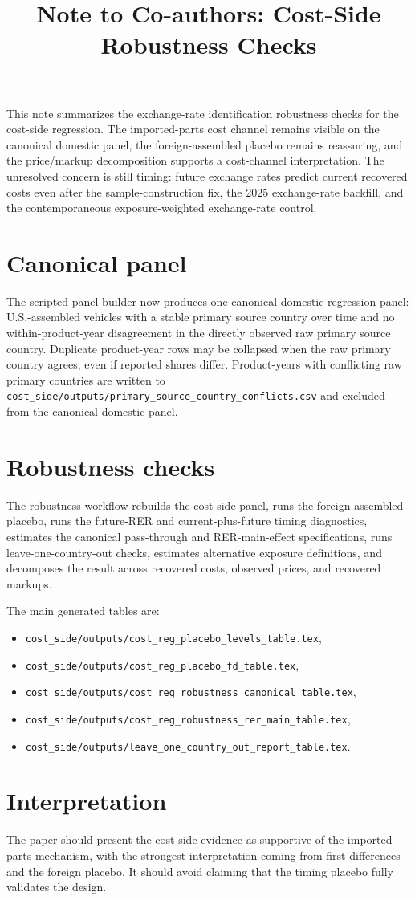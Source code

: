 \documentclass[11pt]{article}
\title{Note to Co-authors: Cost-Side Robustness Checks}
\date{}
\begin{document}
\maketitle

This note summarizes the exchange-rate identification robustness checks for the cost-side regression. The imported-parts cost channel remains visible on the canonical domestic panel, the foreign-assembled placebo remains reassuring, and the price/markup decomposition supports a cost-channel interpretation. The unresolved concern is still timing: future exchange rates predict current recovered costs even after the sample-construction fix, the 2025 exchange-rate backfill, and the contemporaneous exposure-weighted exchange-rate control.

\section*{Canonical panel}

The scripted panel builder now produces one canonical domestic regression panel: U.S.-assembled vehicles with a stable primary source country over time and no within-product-year disagreement in the directly observed raw primary source country. Duplicate product-year rows may be collapsed when the raw primary country agrees, even if reported shares differ. Product-years with conflicting raw primary countries are written to \texttt{cost\_side/outputs/primary\_source\_country\_conflicts.csv} and excluded from the canonical domestic panel.

\section*{Robustness checks}

The robustness workflow rebuilds the cost-side panel, runs the foreign-assembled placebo, runs the future-RER and current-plus-future timing diagnostics, estimates the canonical pass-through and RER-main-effect specifications, runs leave-one-country-out checks, estimates alternative exposure definitions, and decomposes the result across recovered costs, observed prices, and recovered markups.

The main generated tables are:

\begin{itemize}
\item \texttt{cost\_side/outputs/cost\_reg\_placebo\_levels\_table.tex},
\item \texttt{cost\_side/outputs/cost\_reg\_placebo\_fd\_table.tex},
\item \texttt{cost\_side/outputs/cost\_reg\_robustness\_canonical\_table.tex},
\item \texttt{cost\_side/outputs/cost\_reg\_robustness\_rer\_main\_table.tex},
\item \texttt{cost\_side/outputs/leave\_one\_country\_out\_report\_table.tex}.
\end{itemize}

\section*{Interpretation}

The paper should present the cost-side evidence as supportive of the imported-parts mechanism, with the strongest interpretation coming from first differences and the foreign placebo. It should avoid claiming that the timing placebo fully validates the design.
\end{document}
